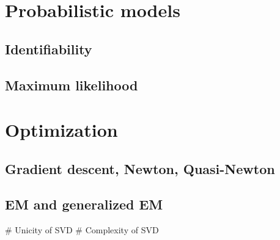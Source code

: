 \section{Probabilistic models}
\subsection{Identifiability}
\subsection{Maximum likelihood}
\section{Optimization}
\subsection{Gradient descent, Newton, Quasi-Newton}
\subsection{EM and generalized EM}

# Unicity of SVD
# Complexity of SVD